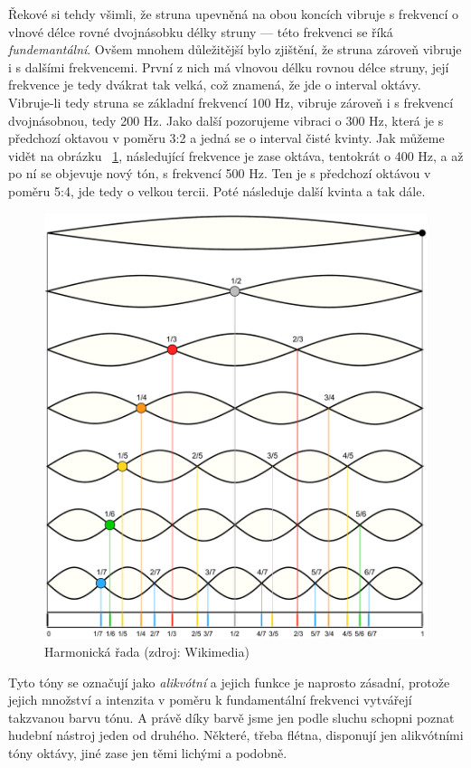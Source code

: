 \documentclass[12pt]{article}
\begin{document}
Řekové si tehdy všimli, že struna upevněná na obou koncích vibruje s frekvencí o vlnové délce rovné dvojnásobku délky struny — této frekvenci se říká \emph{fundemantální}. Ovšem mnohem důležitější bylo zjištění, že struna zároveň vibruje i s dalšími frekvencemi. První z nich má vlnovou délku rovnou délce struny, její frekvence je tedy dvákrat tak velká, což znamená, že jde o interval oktávy. Vibruje-li tedy struna se základní frekvencí 100 Hz, vibruje zároveň i s frekvencí dvojnásobnou, tedy 200 Hz. Jako další pozorujeme vibraci o 300 Hz, která je s předchozí oktavou v poměru 3:2 a jedná se o interval čisté kvinty. Jak můžeme vidět na obrázku ~\ref{fig:harmonics}, následující frekvence je zase oktáva, tentokrát o 400 Hz, a až po ní se objevuje nový tón, s frekvencí 500 Hz. Ten je s předchozí oktávou v poměru 5:4, jde tedy o velkou tercii. Poté následuje další kvinta a tak dále.

\begin{figure}[p]\centering
	\includegraphics[width = .9 \textwidth]{harmonics.pdf}
	\caption{Harmonická řada (zdroj: Wikimedia)}
	\label{fig:harmonics}
\end{figure}

Tyto tóny se označují jako \emph{alikvótní} a jejich funkce je naprosto zásadní, protože jejich množství a intenzita v poměru k fundamentální frekvenci vytvářejí takzvanou barvu tónu. A právě díky barvě jsme jen podle sluchu schopni poznat hudební nástroj jeden od druhého. Některé, třeba flétna, disponují jen alikvótními tóny oktávy, jiné zase jen těmi lichými a podobně.
\end{document}
